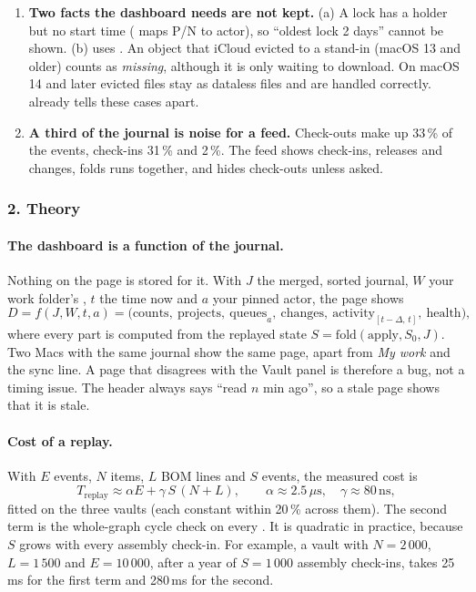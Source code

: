 \begin{enumerate}[nosep]
        The window is a few milliseconds, but the dashboard reads more often than today's page. Its workspace must not write
        (step~1).
  \item \textbf{Two facts the dashboard needs are not kept.} (a) A lock has a holder but no start time ( maps
        P/N to actor), so ``oldest lock 2 days'' cannot be shown. (b)  uses
        . An object that iCloud evicted to a  stand-in (macOS 13 and older) counts
        as \emph{missing}, although it is only waiting to download. On macOS 14 and later evicted files stay as dataless
        files and are handled correctly.  already tells these cases apart.
  \item \textbf{A third of the journal is noise for a feed.} Check-outs make up 33\,\% of the events, check-ins 31\,\% and
         2\,\%. The feed shows check-ins, releases and changes, folds runs together, and hides check-outs
        unless asked.
\end{enumerate}

\subsubsection*{2. Theory}

\paragraph{The dashboard is a function of the journal.} Nothing on the page is stored for it. With $J$ the merged, sorted
journal, $W$ your work folder's , $t$ the time now and $a$ your pinned actor, the page shows
\[
  D = f(J, W, t, a) = \bigl(\text{counts},\ \text{projects},\ \text{queues}_a,\ \text{changes},\ \text{activity}_{[t-\Delta,\,t]},\ \text{health}\bigr),
\]
where every part is computed from the replayed state $S = \mathrm{fold}(\mathrm{apply}, S_0, J)$. Two Macs with the same
journal show the same page, apart from \emph{My work} and the sync line. A page that disagrees with the Vault panel is
therefore a bug, not a timing issue. The header always says ``read $n$ min ago'', so a stale page shows that it is stale.

\paragraph{Cost of a replay.} With $E$ events, $N$ items, $L$ BOM lines and $S$  events, the measured cost is
\[
  T_\text{replay} \approx \alpha E + \gamma\, S\,(N + L), \qquad \alpha \approx 2.5\,\mu\text{s},\quad \gamma \approx 80\,\text{ns},
\]
fitted on the three vaults (each constant within 20\,\% across them). The second term is the whole-graph cycle check on
every . It is quadratic in practice, because $S$ grows with every assembly check-in. For example, a vault with
$N = 2\,000$, $L = 1\,500$ and $E = 10\,000$, after a year of $S = 1\,000$ assembly check-ins, takes 25\,ms for the first
term and 280\,ms for the second.

